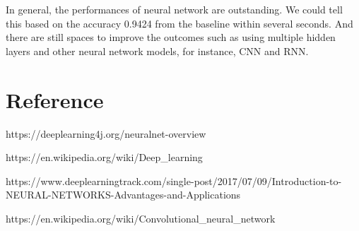 \documentclass[11pt]{article}
\begin{document}
In general, the performances of neural network are outstanding. We could
tell this based on the accuracy 0.9424 from the baseline within several
seconds. And there are still spaces to improve the outcomes such as
using multiple hidden layers and other neural network models, for
instance, CNN and RNN.

    \hypertarget{reference}{%
\section{Reference}\label{reference}}

    https://deeplearning4j.org/neuralnet-overview

https://en.wikipedia.org/wiki/Deep\_learning

https://www.deeplearningtrack.com/single-post/2017/07/09/Introduction-to-NEURAL-NETWORKS-Advantages-and-Applications

https://en.wikipedia.org/wiki/Convolutional\_neural\_network


    
    
    
    
\end{document}
